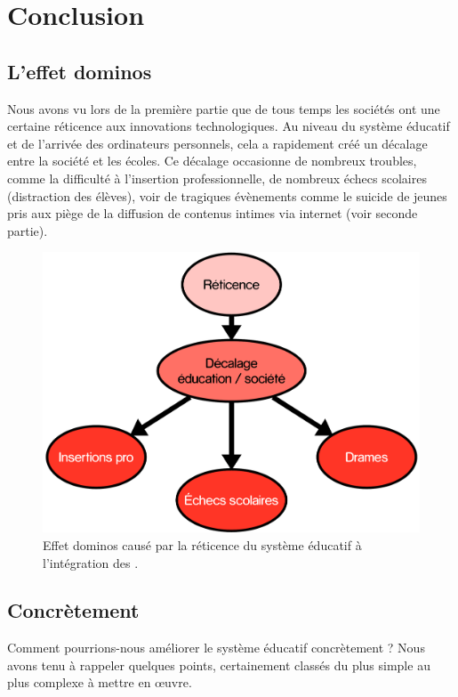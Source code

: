 
\part{Conclusion}\label{conclu}

\chapter*{L'effet dominos}
Nous avons vu lors de la première partie que de tous temps les sociétés ont une certaine réticence aux innovations technologiques. Au niveau du système éducatif et de l'arrivée des ordinateurs personnels, cela a rapidement créé un décalage entre la société et les écoles. Ce décalage occasionne de nombreux troubles, comme la difficulté à l'insertion professionnelle, de nombreux échecs scolaires (distraction des élèves), voir de tragiques évènements comme le suicide de jeunes pris aux piège de la diffusion de contenus intimes via internet (voir seconde partie).

\begin{figure}[H]
  \includegraphics[width=\textwidth]{../resources/illustrations/ccl}
  \caption{Effet dominos causé par la réticence du système éducatif à l'intégration des .}
\end{figure}

\chapter*{Concrètement}
Comment pourrions-nous améliorer le système éducatif concrètement ? Nous avons tenu à rappeler quelques points, certainement classés du plus simple au plus complexe à mettre en œuvre.

